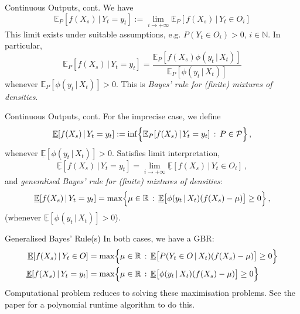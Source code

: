 \documentclass{beamer}
\begin{document}
\begin{frame}{Continuous Outputs, cont.}
We have
\begin{equation*}
\mathbb{E}_P[f(X_s)\,\vert\,Y_t=y_t] := \lim_{i\to+\infty} \mathbb{E}_P[f(X_s)\,\vert\,Y_t\in O_i]
\end{equation*}
This limit exists under suitable assumptions, e.g. $P(Y_t\in O_i)>0$, $i\in\mathbb{N}$.
\newline\newline
In particular,
\begin{equation*}
\mathbb{E}_P[f(X_s)\,\vert\,Y_t=y_t] = \frac{\mathbb{E}_P[f(X_s)\phi(y_t\,\vert\,X_t)]}{\mathbb{E}_P[\phi(y_t\,\vert\,X_t)]}
\end{equation*}
whenever $\mathbb{E}_P[\phi(y_t\,\vert\,X_t)]>0$.
\newline\newline
This is \emph{Bayes' rule for (finite) mixtures of densities}.
\end{frame}

\begin{frame}{Continuous Outputs, cont.}
For the imprecise case, we define
\begin{equation*}
\underline{\mathbb{E}}[f(X_s)\,\vert\,Y_t=y_t] := \inf\Bigl\{ \mathbb{E}_P[f(X_s)\,\vert\,Y_t=y_t]\,:\, P\in\mathcal{P} \Bigr\}\,,
\end{equation*}
whenever $\underline{\mathbb{E}}[\phi(y_t\,\vert\,X_t)]>0$.
\newline\newline
Satisfies limit interpretation,
\begin{equation*}
\underline{\mathbb{E}}[f(X_s)\,\vert\,Y_t=y_t] = \lim_{i\to+\infty} \underline{\mathbb{E}}[f(X_s)\,\vert\,Y_t\in O_i]\,,
\end{equation*}
and \emph{generalised Bayes' rule for (finite) mixtures of densities}:
\begin{equation*}
\underline{\mathbb{E}}[f(X_s)\,\vert\,Y_t=y_t] = \max\Bigl\{ \mu\in\mathbb{R}\,:\, \underline{\mathbb{E}}\bigl[\phi(y_t\,\vert\,X_t)(f(X_s) - \mu)\bigr] \geq 0 \Bigr\}\,,
\end{equation*}
(whenever $\underline{\mathbb{E}}[\phi(y_t\,\vert\,X_t)]>0$).
\end{frame}

\begin{frame}{Generalised Bayes' Rule(s)}
In both cases, we have a GBR:
\begin{align*}
\underline{\mathbb{E}}[f(X_s)\,\vert\, Y_t\in O] &= \max\Bigl\{ \mu\in\mathbb{R}\,:\, \underline{\mathbb{E}}\bigl[P(Y_t\in O\,\vert\,X_t)(f(X_s) - \mu)\bigr] \geq 0 \Bigr\} \\
\underline{\mathbb{E}}[f(X_s)\,\vert\,Y_t=y_t] &= \max\Bigl\{ \mu\in\mathbb{R}\,:\, \underline{\mathbb{E}}\bigl[\phi(y_t\,\vert\,X_t)(f(X_s) - \mu)\bigr] \geq 0 \Bigr\}
\end{align*}
\newline\newline
Computational problem reduces to solving these maximisation problems.
\newline\newline
See the paper for a polynomial runtime algorithm to do this.
\end{frame}
\end{document}
